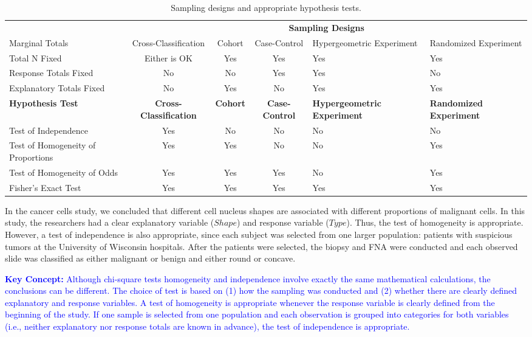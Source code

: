 \documentclass[
]{book}
\begin{document}
\begin{table}[!h]
\centering
\caption{\label{tab:tab56} Sampling designs and appropriate hypothesis tests.}
\centering
\begin{tabular}[t]{>{\raggedright\arraybackslash}p{2cm}ccc>{\centering\arraybackslash}p{3cm}>{\centering\arraybackslash}p{2.5cm}}
\toprule
\multicolumn{1}{c}{\textbf{ }} & \multicolumn{5}{c}{\textbf{Sampling Designs}} \\
\cmidrule(l{3pt}r{3pt}){2-6}
Marginal Totals & Cross-Classification & Cohort & Case-Control & Hypergeometric Experiment & Randomized Experiment\\
\midrule
Total N Fixed & Either is OK & Yes & Yes & Yes & Yes\\
Response Totals Fixed & No & No & Yes & Yes & No\\
Explanatory Totals Fixed & No & Yes & No & Yes & Yes\\
\textbf{Hypothesis Test} & \textbf{Cross-Classification} & \textbf{Cohort} & \textbf{Case-Control} & \textbf{Hypergeometric Experiment} & \textbf{Randomized Experiment}\\
Test of Independence & Yes & No & No & No & No\\
\addlinespace
Test of Homogeneity of Proportions & Yes & Yes & No & No & Yes\\
Test of Homogeneity of Odds & Yes & Yes & Yes & No & Yes\\
Fisher's Exact Test & Yes & Yes & Yes & Yes & Yes\\
\bottomrule
\end{tabular}
\end{table}

In the cancer cells study, we concluded that different cell nucleus shapes are associated with different
proportions of malignant cells. In this study, the researchers had a clear explanatory variable (\(Shape\)) and response variable (\(Type\)). Thus, the test of homogeneity is appropriate. However, a test of independence is also appropriate, since each subject was selected from one larger population: patients with suspicious tumors at the University of Wisconsin hospitals. After the patients were selected, the biopsy and FNA were conducted and each observed slide was classified as either malignant or benign and either round or concave.

\textbf{\textcolor{blue}{Key Concept:}}
\textcolor{blue}{Although chi-square tests homogeneity and independence involve exactly the same mathematical calculations, the conclusions can be different. The choice of test is based on (1) how the sampling was conducted and (2) whether there are clearly defined explanatory and response variables. A test of homogeneity is appropriate whenever the response variable is clearly defined from the beginning of the study. If one sample is selected from one population and each observation is grouped into categories for both variables (i.e., neither explanatory nor response totals are known in advance), the test of independence is appropriate.}
\end{document}
